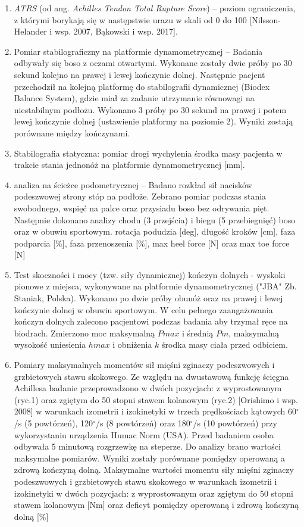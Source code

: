 \begin{enumerate}
	\item \textit{ATRS} (od ang. \textit{Achilles Tendon Total Rupture Score}) -- poziom ograniczenia, z którymi borykają się w następstwie urazu w skali od 0 do 100 [Nilsson-Helander i wsp. 2007, Bąkowski i wsp. 2017].
	\item Pomiar stabilograficzny na platformie dynamometrycznej -- Badania odbywały się boso z oczami otwartymi. Wykonane zostały dwie próby po 30 sekund kolejno na prawej i lewej kończynie dolnej. Następnie pacjent przechodził na kolejną platformę do stabilografii dynamicznej (Biodex Balance System), gdzie miał za zadanie utrzymanie równowagi na niestabilnym podłożu. Wykonano 3 próby po 30 sekund na prawej i potem lewej kończynie dolnej (ustawienie platformy na poziomie 2). Wyniki zostają porównane między kończynami. 
	\item Stabilografia statyczna: pomiar drogi wychylenia środka masy pacjenta w trakcie stania jednonóż na platformie dynamometrycznej [mm].
	\item analiza na ścieżce podometrycznej -- Badano rozkład sił nacisków podeszwowej strony stóp na podłoże. Zebrano pomiar podczas stania swobodnego, wspięć na palce oraz przysiadu boso bez odrywania pięt. Następnie dokonano analizy chodu (3 przejścia) i biegu (5 przebiegnięć) boso oraz w obuwiu sportowym. rotacja podudzia [deg], długość kroków [cm], faza podparcia [\%], faza przenoszenia [\%], max heel force [N] oraz max toe force [N]
	\item Test skoczności i mocy (tzw. siły dynamicznej) kończyn dolnych - wyskoki pionowe z miejsca, wykonywane na platformie dynamometrycznej ("JBA" Zb. Staniak, Polska). Wykonano po dwie próby obunóż oraz na prawej i lewej kończynie dolnej w obuwiu sportowym. W celu pełnego zaangażowania kończyn dolnych zalecono pacjentowi podczas badania aby trzymał ręce na biodrach. Zmierzono moc maksymalną $Pmax$ i średnią $Pm$, maksymalną wysokość uniesienia $hmax$ i obniżenia $k$ środka masy ciała przed odbiciem.
	\item Pomiary maksymalnych momentów sił mięśni zginaczy podeszwowych i grzbietowych stawu skokowego. Ze względu na dwustawową funkcję ścięgna Achillesa badanie przeprowadzono w dwóch pozycjach: z wyprostowanym (ryc.1) oraz zgiętym do 50 stopni stawem kolanowym (ryc.2) [Orishimo i wsp. 2008] w warunkach izometrii i izokinetyki w trzech prędkościach kątowych 60$^\circ$/s (5 powtórzeń), 120$^\circ$/s (8 powtórzeń) oraz 180$^\circ$/s (10 powtórzeń) przy wykorzystaniu urządzenia Humac Norm (USA). Przed badaniem osoba odbywała 5 minutową rozgrzewkę na steperze. Do analizy brano wartości maksymalne pomiarów. Wyniki zostały porównane pomiędzy operowaną a zdrową kończyną dolną. Maksymalne wartości momentu siły mięśni zginaczy podeszwowych i grzbietowych stawu skokowego w warunkach izometrii i izokinetyki w dwóch pozycjach: z wyprostowanym oraz zgiętym do 50 stopni stawem kolanowym [Nm] oraz deficyt pomiędzy operowaną i zdrową kończyną dolną [\%]
\end{enumerate}


